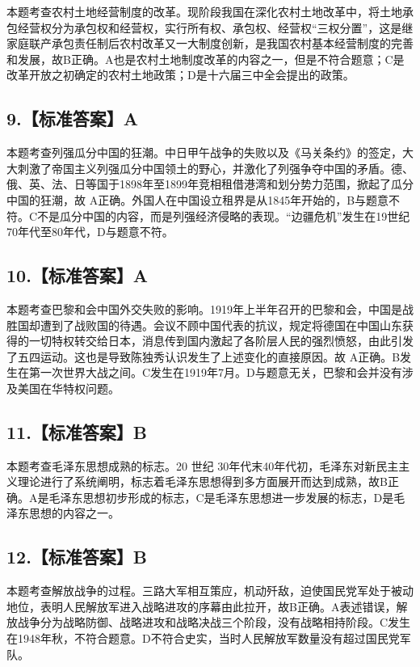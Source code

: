 \documentclass[UTF8,11pt]{ctexart}
\begin{document}
本题考查农村土地经营制度的改革。现阶段我国在深化农村土地改革中，将土地承包经营权分为承包权和经营权，实行所有权、承包权、经营权“三权分置”，这是继家庭联产承包责任制后农村改革又一大制度创新，是我国农村基本经营制度的完善和发展，故B正确。A也是农村土地制度改革的内容之一，但是不符合题意；C是改革开放之初确定的农村土地政策；D是十六届三中全会提出的政策。


\subsection*{9.【标准答案】A}

本题考查列强瓜分中国的狂潮。中日甲午战争的失败以及《马关条约》的签定，大大刺激了帝国主义列强瓜分中国领土的野心，并激化了列强争夺中国的矛盾。德、俄、英、法、日等国于1898年至1899年竞相租借港湾和划分势力范围，掀起了瓜分中国的狂潮，故 A正确。外国人在中国设立租界是从1845年开始的，B与题意不符。C不是瓜分中国的内容，而是列强经济侵略的表现。“边疆危机”发生在19世纪70年代至80年代，D与题意不符。


\subsection*{10.【标准答案】A}

本题考查巴黎和会中国外交失败的影响。1919年上半年召开的巴黎和会，中国是战胜国却遭到了战败国的待遇。会议不顾中国代表的抗议，规定将德国在中国山东获得的一切特权转交给日本，消息传到国内激起了各阶层人民的强烈愤怒，由此引发了五四运动。这也是导致陈独秀认识发生了上述变化的直接原因。故 A正确。B发生在第一次世界大战之间。C发生在1919年7月。D与题意无关，巴黎和会并没有涉及美国在华特权问题。


\subsection*{11.【标准答案】B}

本题考查毛泽东思想成熟的标志。20 世纪 30年代末40年代初，毛泽东对新民主主义理论进行了系统阐明，标志着毛泽东思想得到多方面展开而达到成熟，故B正确。A是毛泽东思想初步形成的标志，C是毛泽东思想进一步发展的标志，D是毛泽东思想的内容之一。


\subsection*{12.【标准答案】B}

本题考查解放战争的过程。三路大军相互策应，机动歼敌，迫使国民党军处于被动地位，表明人民解放军进入战略进攻的序幕由此拉开，故B正确。A表述错误，解放战争分为战略防御、战略进攻和战略决战三个阶段，没有战略相持阶段。C发生在1948年秋，不符合题意。D不符合史实，当时人民解放军数量没有超过国民党军队。
\end{document}

